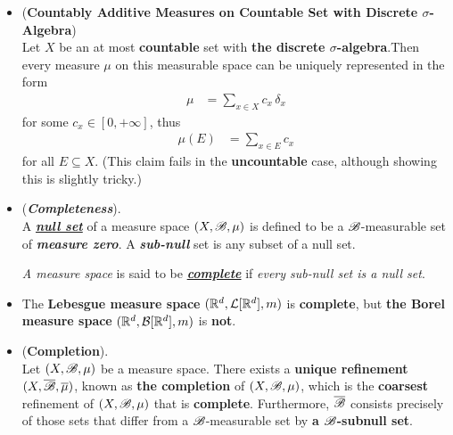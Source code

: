 \documentclass[11pt]{article}
\begin{document}
\begin{itemize}
\item \begin{proposition}  (\textbf{Countably Additive Measures on Countable Set with Discrete $\sigma$-Algebra})\\
Let $X$ be an at most \textbf{countable} set with \textbf{the discrete $\sigma$-algebra}.Then every measure $\mu$ on this measurable space can be uniquely represented in the form
\begin{align*}
\mu &= \sum_{x \in X}c_x \, \delta_x
\end{align*} for some $c_x \in [0, +\infty]$, thus
\begin{align*}
\mu(E) &= \sum_{x \in E}c_x
\end{align*} for all $E \subseteq X$. (This claim fails in the \textbf{uncountable} case, although showing this is slightly tricky.)
\end{proposition}

\item \begin{definition}(\emph{\textbf{Completeness}}). \citep{tao2011introduction} \\
A \underline{\emph{\textbf{null set}}} of a measure space $(X, {\mathscr B}, \mu)$ is defined to be a ${\mathscr B}$-measurable set of \emph{\textbf{measure zero}}. A \emph{\textbf{sub-null}} set is any subset of a null set. 

\emph{A measure space} is said to be \underline{\emph{\textbf{complete}}} if \emph{every sub-null set is a null set}.
\end{definition}

\item \begin{theorem}
The \textbf{Lebesgue measure space} $({\mathbb R}^d, {\mathcal L}[{\mathbb R}^d], m)$ is \textbf{complete}, but \textbf{the Borel measure space} $({\mathbb R}^d, {\mathcal B}[{\mathbb R}^d], m)$ is \textbf{not}.
\end{theorem}

\item \begin{proposition} (\textbf{Completion}).\\
 Let $(X, {\mathscr B}, \mu)$  be a measure space. There exists a \textbf{unique refinement} $(X, \overline{{\mathscr B}}, \overline{\mu})$, known as \textbf{the completion} of $(X, {\mathscr B}, \mu)$, which is the \textbf{coarsest} refinement of  $(X, {\mathscr B}, \mu)$ that is \textbf{complete}. Furthermore, $\overline{{\mathscr B}}$ consists precisely of those sets that differ from a ${\mathscr B}$-measurable set by \textbf{a ${\mathscr B}$-subnull set}.
\end{proposition}


\end{itemize}
\end{document}
